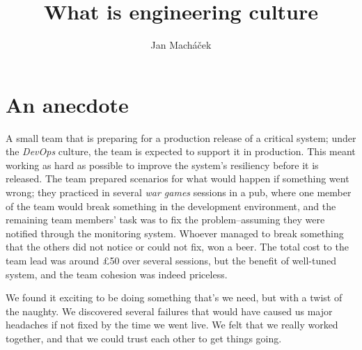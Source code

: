 



\title{What is engineering culture}

\author{Jan Macháček}




\section{An anecdote}
A small team that is preparing for a production release of a critical system; under the \emph{DevOps} culture, the team is expected to support it in production. This meant working as hard as possible to improve the system's resiliency before it is released. The team prepared scenarios for what would happen if something went wrong; they practiced in several \emph{war games} sessions in a pub, where one member of the team would break something in the development environment, and the remaining team members' task was to fix the problem--assuming they were notified through the monitoring system. Whoever managed to break something that the others did not notice or could not fix, won a beer. The total cost to the team lead was around £50 over several sessions, but the benefit of well-tuned system, and the team cohesion was indeed priceless.

\begin{example}
We found it exciting to be doing something that's we need, but with a twist of the naughty. We discovered several failures that would have caused us major headaches if not fixed by the time we went live. We felt that we really worked together, and that we could trust each other to get things going. 
\end{example}

